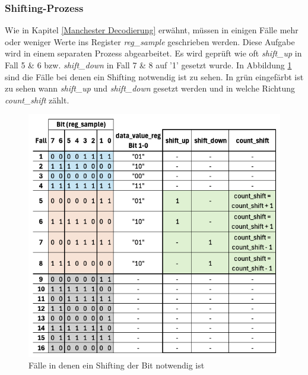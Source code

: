 \newpage

\subsubsection{Shifting-Prozess}
\label{Shifting-Prozess}
Wie in Kapitel \ref{Manchester Decodierung} erwähnt, müssen in einigen Fälle mehr oder weniger
Werte ins Register \textit{reg\_sample} geschrieben werden. Diese Aufgabe wird in einem
separaten Prozess abgearbeitet. Es wird geprüft wie oft \textit{shift\_up} in Fall 5 \& 6 bzw. \textit{shift\_down} in Fall 7 \& 8 auf '1' gesetzt wurde.
In Abbildung \ref{fig:FPGAShiftingCases} sind die Fälle bei denen ein Shifting notwendig ist
zu sehen. In grün eingefärbt ist zu sehen wann \textit{shift\_up} und \textit{shift\_down}
gesetzt werden und in welche Richtung \textit{count\_shift} zählt.

\begin{figure}[H]
    \centering
    \includegraphics[width=0.9\linewidth]{Figures//Chap3//FPGA/FPGA_Shifting.png}
    \caption{Fälle in denen ein Shifting der Bit notwendig ist}
    \label{fig:FPGAShiftingCases}
\end{figure}

